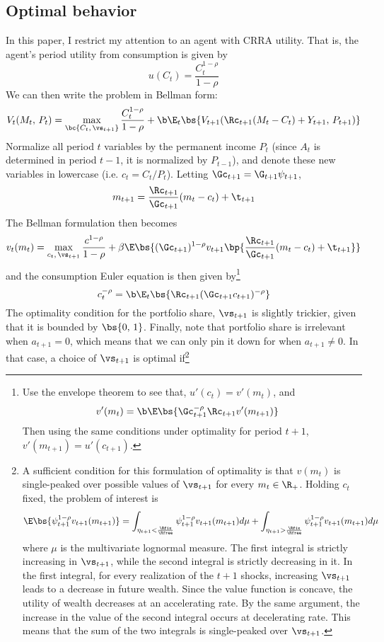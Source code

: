 \subsection{Optimal behavior}

In this paper, I restrict my attention to an agent with CRRA utility. That is, the agent's period utility from consumption is given by
\[
u(C_t) = \frac{C_t^{1-\rho}}{1-\rho}
\]
We can then write the problem in Bellman form:
\begin{equation}
    V_t(M_t,\,P_t) = \max_{\bc{C_t,\,\vs_{t+1}}}\frac{C_{t}^{1-\rho}}{1 - \rho} + \b \E_t\bs{V_{t+1}(\Rc_{t+1}(M_t - C_{t}) + Y_{t+1},\,P_{t+1})}
\end{equation}
Normalize all period $t$ variables by the permanent income $P_t$ (since $A_t$ is determined in period $t-1$, it is normalized by $P_{t-1}$), and denote these new variables in lowercase (i.e. $c_t = C_t / P_t$). Letting $\Gc_{t+1} = \G_{t+1}\psi_{t+1}$,
\begin{align*}
    m_{t+1} = \frac{\Rc_{t+1}}{\Gc_{t+1}}(m_t - c_t) + \t_{t+1}
\end{align*}
The Bellman formulation then becomes
\begin{equation}\label{eq:bellman}
    v_{t}(m_t) = \max_{c_{t},\,\vs_{t+1}}\frac{c^{1-\rho}}{1-\rho} + \beta \E\bs{(\Gc_{t+1})^{1-\rho}v_{t+1}\bp{\frac{\Rc_{t+1}}{\Gc_{t+1}}(m_t - c_t) + \t_{t+1}}}
\end{equation}
and the consumption Euler equation is then given by\footnote{Use the envelope theorem to see that, $u'(c_t) = v'(m_t)$, and
\begin{align*}
    v'(m_t) &= \b \E\bs{\Gc_{t+1}^{-\rho}\Rc_{t+1}v'(m_{t+1})}
\end{align*}
Then using the same conditions under optimality for period $t+1$, $v'(m_{t+1}) = u'(c_{t+1})$.
}
\begin{equation}\label{eq:euler}
    c_t^{-\rho} = \b \E_{t}\bs{\Rc_{t+1}(\Gc_{t+1}c_{t+1})^{-\rho}}
\end{equation}
The optimality condition for the portfolio share, $\vs_{t+1}$ is slightly trickier, given that it is bounded by $\bs{0,\,1}$. Finally, note that portfolio share is irrelevant when $a_{t+1} = 0$, which means that we can only pin it down for when $a_{t+1} \neq 0$. In that case, a choice of $\vs_{t+1}$ is optimal if\footnote{A sufficient condition for this formulation of optimality is that $v(m_t)$ is single-peaked over possible values of $\vs_{t+1}$ for every $m_t \in \R_{+}$. Holding $c_t$ fixed, the problem of interest is
\[
\E\bs{\psi_{t+1}^{1-\rho}v_{t+1}(m_{t+1})} = \int_{\eta_{t+1} < \frac{\Rfix}{\Rfree}}\psi_{t+1}^{1-\rho}v_{t+1}(m_{t+1})d\mu + \int_{\eta_{t+1} > \frac{\Rfix}{\Rfree}}\psi_{t+1}^{1-\rho}v_{t+1}(m_{t+1})d\mu
\]
where $\mu$ is the multivariate lognormal measure. The first integral is strictly increasing in $\vs_{t+1}$, while the second integral is strictly decreasing in it. In the first integral, for every realization of the $t+1$ shocks, increasing $\vs_{t+1}$ leads to a decrease in future wealth. Since the value function is concave, the utility of wealth decreases at an accelerating rate. By the same argument, the increase in the value of the second integral occurs at decelerating rate. This means that the sum of the two integrals is single-peaked over $\vs_{t+1}$.}
